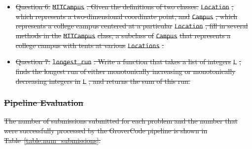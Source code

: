 \documentclass[12pt,twoside]{mitthesis}
\providecommand{\DIFdeltex}[1]{{\protect\color{red}\sout{#1}}}                      %
\providecommand{\DIFdel}[1]{\texorpdfstring{\DIFdeltex{#1}}{}} %
\begin{document}
{{{{{{{{{{\begin{itemize}

\item%
\DIFdel{Question 6: }\texttt{\DIFdel{MITCampus}}%
\DIFdel{. Given the definitions of two classes: }\texttt{\DIFdel{Location}}%
\DIFdel{, which represents a two-dimensional coordinate point, and }\texttt{\DIFdel{Campus}}%
\DIFdel{, which represents a college campus centered at a particular }\texttt{\DIFdel{Location}}%
\DIFdel{, fill in several methods in the }\texttt{\DIFdel{MITCampus}} %
\DIFdel{class, a subclass of }\texttt{\DIFdel{Campus}} %
\DIFdel{that represents a college campus with tents at various }\texttt{\DIFdel{Locations}}%
\DIFdel{.
}%


\item%
\DIFdel{Question 7: }\texttt{\DIFdel{longest\_run}}%
\DIFdel{. Write a function that takes a list of integers }\texttt{\DIFdel{L}}%
\DIFdel{, finds the longest run of either monotonically increasing or monotonically decreasing integers in }\texttt{\DIFdel{L}}%
\DIFdel{, and returns the sum of this run.
}%


 \end{itemize} %

\subsubsection{\DIFdel{Pipeline Evaluation}}
\addtocounter{subsubsection}{-1}%

\DIFdel{The number of submissions submitted for each problem and the number that were successfully processed by the GroverCode pipeline is shown in Table~\ref{table:num_submissions}.
}%

}}}}}}}}}}
\end{document}
